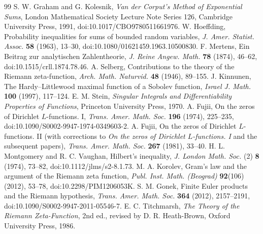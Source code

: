 \documentclass[11pt,reqno]{amsart}
\numberwithin{equation}{section}
\begin{document}
\begin{thebibliography}{99}
S. W. Graham and G. Kolesnik, \emph{Van der Corput's Method of Exponential Sums},
London Mathematical Society Lecture Note Series 126, Cambridge University Press, 1991,
doi:10.1017/CBO9780511661976.
W. Hoeffding, Probability inequalities for sums of bounded random variables,
\emph{J. Amer. Statist. Assoc.} \textbf{58} (1963), 13--30,
doi:10.1080/01621459.1963.10500830.
F. Mertens, Ein Beitrag zur analytischen Zahlentheorie,
\emph{J. Reine Angew. Math.} \textbf{78} (1874), 46--62,
doi:10.1515/crll.1874.78.46.
A. Selberg, Contributions to the theory of the Riemann zeta-function,
\emph{Arch. Math. Naturvid.} \textbf{48} (1946), 89--155.
J. Kinnunen, The Hardy--Littlewood maximal function of a Sobolev function,
\emph{Israel J. Math.} \textbf{100} (1997), 117--124.
E. M. Stein, \emph{Singular Integrals and Differentiability Properties of Functions},
Princeton University Press, 1970.
 A. Fujii, On the zeros of Dirichlet $L$-functions. I, \emph{Trans. Amer. Math. Soc.} \textbf{196} (1974), 225--235, doi:10.1090/S0002-9947-1974-0349603-2.
 A. Fujii, On the zeros of Dirichlet $L$-functions. II (with corrections to \emph{On the zeros of Dirichlet $L$-functions. I} and the subsequent papers), \emph{Trans. Amer. Math. Soc.} \textbf{267} (1981), 33--40.
 H. L. Montgomery and R. C. Vaughan, Hilbert's inequality, \emph{J. London Math. Soc.} (2) \textbf{8} (1974), 73--82, doi:10.1112/jlms/s2-8.1.73.
 M. A. Korolev, Gram's law and the argument of the Riemann zeta function, \emph{Publ. Inst. Math. (Beograd)} \textbf{92}(106) (2012), 53--78, doi:10.2298/PIM1206053K.
 S. M. Gonek, Finite Euler products and the Riemann hypothesis, \emph{Trans. Amer. Math. Soc.} \textbf{364} (2012), 2157--2191, doi:10.1090/S0002-9947-2011-05546-7.
 E. C. Titchmarsh, \emph{The Theory of the Riemann Zeta-Function}, 2nd ed., revised by D. R. Heath-Brown, Oxford University Press, 1986.
\end{thebibliography}
\end{document}
